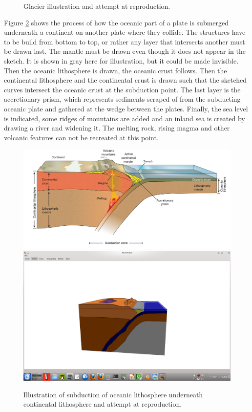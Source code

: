 \documentclass[a4paper,12pt]{report}
\begin{document}
\begin{figure}
 \caption{Glacier illustration and attempt at reproduction.}
 \label{fig:glacier}
\end{figure}

Figure \ref{fig:subduction} shows the process of how the oceanic part of a plate is submerged underneath a continent on another plate where they collide. The structures have to be build from bottom to top, or rather any layer that intersects another must be drawn last. The mantle must be drawn even though it does not appear in the sketch. It is shown in gray here for illustration, but it could be made invisible. Then the oceanic lithosphere is drawn, the oceanic crust follows. Then the continental lithosphere and the continental crust is drawn such that the sketched curves intersect the oceanic crust at the subduction point. The last layer is the accretionary prism, which represents sediments scraped of from the subducting oceanic plate and gathered at the wedge between the plates. Finally, the sea level is indicated, some ridges of mountains are added and an inland sea is created by drawing a river and widening it. The melting rock, rising magma and other volcanic features can not be recreated at this point.
\begin{figure}
\includegraphics[width=.8\linewidth]{thesis/geo/english/subductionCont.jpg}
\includegraphics[trim = 50mm 30mm 50mm 50mm, clip,width=.8\linewidth]{thesis/resultsSection/subductionSketch.png}

 \caption{Illustration of subduction of oceanic lithosphere underneath continental lithosphere and attempt at reproduction.}
 \label{fig:subduction}
\end{figure}
\end{document}
